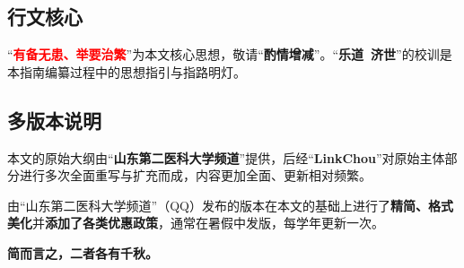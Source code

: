\subsection[行文核心]{行文核心}
“\textcolor{red}{\textbf{有备无患、举要治繁}}”为本文核心思想，敬请“\textbf{酌情增减}”。“\textbf{乐道\ 济世}”的校训是本指南编纂过程中的思想指引与指路明灯。

\subsection[多版本说明]{多版本说明}
本文的原始大纲由“\textbf{山东第二医科大学频道}”提供，后经“\textbf{LinkChou}”对原始主体部分进行多次全面重写与扩充而成，内容更加全面、更新相对频繁。

由“山东第二医科大学频道”（QQ）发布的版本在本文的基础上进行了\textbf{精简、格式美化}并\textbf{添加了各类优惠政策}，通常在暑假中发版，每学年更新一次。

\textbf{简而言之，二者各有千秋。}
